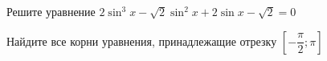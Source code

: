 \begin{ex}
	\begin{condition}
		\begin{enumcols}[label=\asbuk*)]
			\item Решите уравнение \( 2\sin^3 x -\sqrt{2}\sin^2 x +2\sin x - \sqrt{2} = 0 \)
			\item Найдите все корни уравнения, принадлежащие отрезку \( \left[-\dfrac{\pi}{2};\pi\right] \)
		\end{enumcols}
	\end{condition}
\end{ex}